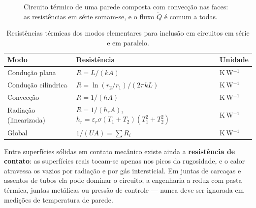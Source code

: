 \documentclass[12pt,a4paper]{article}
\numberwithin{equation}{section}
\numberwithin{table}{section}
\numberwithin{figure}{section}
\begin{document}
\begin{figure}[H]
\centering
{}
\caption[Circuito térmico de uma parede composta com convecção nas faces.]{%
Circuito térmico de uma parede composta com convecção nas faces: as
resistências em série somam-se, e o fluxo $\dot{Q}$ é comum a todas.}
\label{fig:v1-c5-1}
\end{figure}

\begin{table}[H]
\centering
\caption[Resistências térmicas dos modos elementares.]{Resistências
térmicas dos modos elementares para inclusão em circuitos em série e em
paralelo.}
\label{tab:v1-c5-2}
\begin{tabular}{@{}lll@{}}
\toprule
\textbf{Modo} & \textbf{Resistência} & \textbf{Unidade} \\
\midrule
Condução plana & $R = L/(kA)$ & K\,W$^{-1}$ \\
Condução cilíndrica & $R = \ln(r_2/r_1)/(2\pi k L)$ & K\,W$^{-1}$ \\
Convecção & $R = 1/(hA)$ & K\,W$^{-1}$ \\
Radiação (linearizada) & $R = 1/(h_r A)$, \
$h_r = \varepsilon_r \sigma (T_1 + T_2)(T_1^2 + T_2^2)$ & K\,W$^{-1}$ \\
Global & $1/(UA) = \sum R_i$ & K\,W$^{-1}$ \\
\bottomrule
\end{tabular}
\end{table}

Entre superfícies sólidas em contato mecânico existe ainda a
\textbf{resistência de contato}: as superfícies reais tocam-se apenas nos
picos da rugosidade, e o calor atravessa os vazios por radiação e por gás
intersticial. Em juntas de carcaças e assentos de tubos ela pode dominar o
circuito; a engenharia a reduz com pasta térmica, juntas metálicas ou
pressão de controle --- nunca deve ser ignorada em medições de temperatura de
parede.
\end{document}
